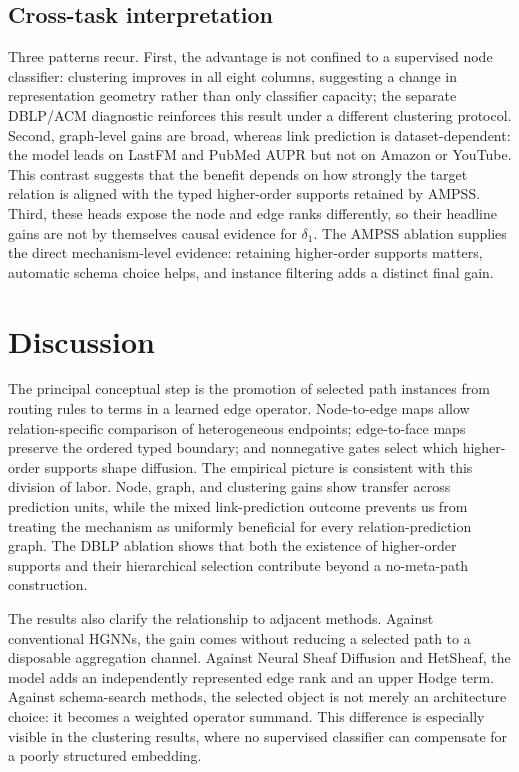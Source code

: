 \subsection{Cross-task interpretation}

Three patterns recur. First, the advantage is not confined to a supervised node classifier:
clustering improves in all eight columns, suggesting a change in representation geometry rather
than only classifier capacity; the separate DBLP/ACM diagnostic reinforces this result under a
different clustering protocol. Second, graph-level gains are broad, whereas link prediction is
dataset-dependent: the model leads on LastFM and PubMed AUPR but not on Amazon or YouTube. This
contrast suggests that the benefit depends on how strongly the target relation is aligned with the
typed higher-order supports retained by AMPSS. Third, these heads expose the node and edge ranks
differently, so their headline gains are not by themselves causal evidence for $\delta_1$. The
AMPSS ablation supplies the direct mechanism-level evidence: retaining higher-order supports
matters, automatic schema choice helps, and instance filtering adds a distinct final gain.

\section{Discussion}
\label{sec:discussion}

The principal conceptual step is the promotion of selected path instances from routing rules to
terms in a learned edge operator. Node-to-edge maps allow relation-specific comparison of
heterogeneous endpoints; edge-to-face maps preserve the ordered typed boundary; and nonnegative
gates select which higher-order supports shape diffusion. The empirical picture is consistent with
this division of labor. Node, graph, and clustering gains show transfer across prediction units,
while the mixed link-prediction outcome prevents us from treating the mechanism as uniformly
beneficial for every relation-prediction graph. The DBLP ablation shows that both the existence of
higher-order supports and their hierarchical selection contribute beyond a no-meta-path
construction.

The results also clarify the relationship to adjacent methods. Against conventional HGNNs, the
gain comes without reducing a selected path to a disposable aggregation channel. Against Neural
Sheaf Diffusion and HetSheaf, the model adds an independently represented edge rank and an upper
Hodge term. Against schema-search methods, the selected object is not merely an architecture choice:
it becomes a weighted operator summand. This difference is especially visible in the clustering
results, where no supervised classifier can compensate for a poorly structured embedding.

